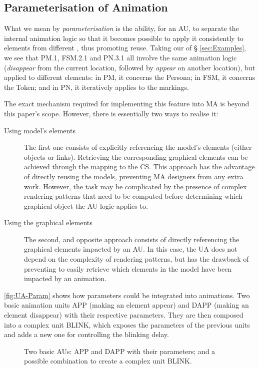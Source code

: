 \subsection{Parameterisation of Animation}
\label{sec:Param}

What we mean by \emph{parameterisation} is the ability, for an AU, to separate 
the internal animation logic so that it becomes possible to apply it consistently
to elements from different \DSLs, thus promoting reuse. Taking our \DSLs of \S 
\ref{sec:Examples}, we see that \textsf{PM.1}, \textsf{FSM.2.1} and \textsf{PN.3.1}
all involve the same animation logic (\emph{disappear} from the current location, 
followed by \emph{appear} on another location), but applied to different elements:
in \textsf{PM}, it concerns the \textsf{Persona}; in \textsf{FSM}, it concerns the
\textsf{Token}; and in \textsf{PN}, it iteratively applies to the markings.

The exact mechanism required for implementing this feature into MA is beyond this
paper's scope. However, there is essentially two ways to realise it:
\begin{description}
   \item[Using model's elements] The first one consists of explicitly referencing
   the model's elements (either objects or links). Retrieving the corresponding 
   graphical elements can be achieved through the mapping to the CS. This approach
   has the advantage of directly reusing the models, preventing MA designers from
   any extra work. However, the task may be complicated by the presence of complex
   rendering patterns that need to be computed before determining which graphical
   object the AU logic applies to.
   
   \item[Using the graphical elements] The second, and opposite approach consists
   of directly referencing the graphical elements impacted by an AU. In this case,
   the UA does not depend on the complexity of rendering patterns, but has the 
   drawback of preventing to easily retrieve which elements in the model have been
   impacted by an animation.
\end{description}

\autoref{fig:UA-Param} shows how parameters could be integrated into animations. 
Two basic animation units \textsf{APP} (making an element appear) and \textsf{DAPP}
(making an element disappear) with their respective parameters. They are then
composed into a complex unit \textsf{BLINK}, which exposes the parameters of
the previous units and adds a new one for controlling the blinking delay.

\begin{figure}[t]%
   \centering
   \caption{Two basic AUs: \textsf{APP} and \textsf{DAPP} with their parameters;
   and a possible combination to create a complex unit \textsf{BLINK}.
   }%
   \label{fig:UA-Param}%
\end{figure}